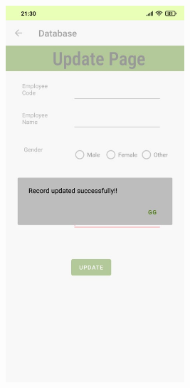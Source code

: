 \documentclass[12pt,letterpaper]{article}
\begin{document}
\begin{figure}
    \centering
    \includegraphics[height=14cm, keepaspectratio]{Outputs/OP8.png}
\end{figure}

\newpage
\end{document}
